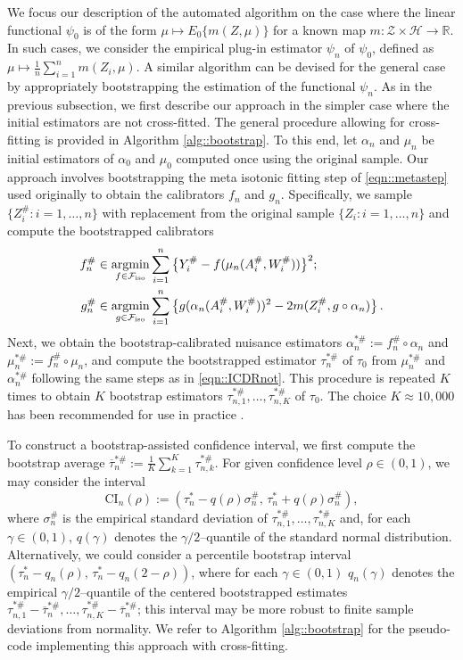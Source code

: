 \documentclass[11pt]{article}
\theoremstyle{plain}
\DeclareMathOperator*{\argmin}{argmin}
\begin{document}
 
We focus our description of the automated algorithm on the case where the linear functional \( \psi_0 \) is of the form \( \mu \mapsto E_0\{m(Z, \mu)\} \) for a known map \( m: \mathcal{Z} \times \mathcal{H} \rightarrow \mathbb{R} \). In such cases, we consider the empirical plug-in estimator \( \psi_n \) of \( \psi_0 \), defined as \( \mu \mapsto \frac{1}{n} \sum_{i=1}^n m(Z_i, \mu) \). A similar algorithm can be devised for the general case by appropriately bootstrapping the estimation of the functional \( \psi_n \). As in the previous subsection, we first describe our approach in the simpler case where the initial estimators are not cross-fitted. The general procedure allowing for cross-fitting is provided in Algorithm \ref{alg::bootstrap}. To this end, let $\alpha_n$ and $\mu_n$ be initial estimators of $\alpha_0$ and $\mu_0$ computed once using the original sample. Our approach involves bootstrapping the meta isotonic fitting step of \eqref{eqn::metastep} used originally to obtain the calibrators $f_n$ and $g_n$. Specifically, we sample $\{Z_i^{\#}: i=1,\ldots,n\}$ with replacement from the original sample $\{Z_i: i=1,\ldots,n\}$ and compute the bootstrapped calibrators
\begin{align*}
     f_n^{\#} &\in \argmin_{f \in \mathcal{F}_{\text{iso}}} \sum_{i=1}^n  \big{\{} Y_{i}^{\#} - f(\mu_{n}(A_i^{\#}, W_i^{\#}))\big{\}}^2;\\
    g_n^{\#} &\in \argmin_{g \in \mathcal{F}_{\text{iso}}}  \sum_{i=1}^n \big{\{}g(\alpha_{n}(A_i^{\#}, W_i^{\#}))^2 - 2m(Z_i^{\#},  g \circ \alpha_{n}) \big{\}}\,.
\end{align*}  
Next, we obtain the bootstrap-calibrated nuisance estimators $\alpha_{n}^{*\#} := f_n^{\#} \circ \alpha_{n}$ and $\mu_{n}^{*\#} := f_n^{\#} \circ \mu_{n}$, and compute the bootstrapped estimator $\tau_n^{*\#}$ of $\tau_0$ from $\mu_{n}^{*\#}$ and $\alpha_{n}^{*\#}$ following the same steps as in \eqref{eqn::ICDRnot}. This procedure is repeated $K$ times to obtain $K$ bootstrap estimators $\tau_{n,1}^{*\#},\ldots,\tau_{n,K}^{*\#}$ of $\tau_0$. The choice $K \approx 10,000$ has been recommended for use in practice \citep{efron1994introduction}.

To construct a bootstrap-assisted confidence interval, we first compute the bootstrap average $\overline{\tau}_n^{*\#} := \frac{1}{K}\sum_{k=1}^K \tau_{n,k}^{*\#}$. For given confidence level $\rho \in (0,1)$, we may consider the interval \[\text{CI}_n(\rho) := \left(\tau_n^*-q(\rho) \sigma_n^{\#},\,\tau_n^*+q(\rho) \sigma_n^{\#}\right),\] where $\sigma_n^{\#}$ is the empirical standard deviation of $\tau_{n,1}^{*\#},\ldots,\tau_{n,K}^{*\#}$ and, for each $\gamma\in(0,1)$, $q(\gamma)$ denotes the $\gamma/2$--quantile of the standard normal distribution. 
Alternatively, we could consider a percentile bootstrap interval $\left(\tau_n^*-q_{n}(\rho),\,\tau_n^*-q_n(2-\rho)\right)$, where for each $\gamma\in(0,1)$ $q_{n}(\gamma)$ denotes the empirical $\gamma/2$--quantile of the centered bootstrapped estimates $\tau_{n,1}^{*\#} - \overline{\tau}_n^{*\#},\ldots,\tau_{n,K}^{*\#} - \overline{\tau}_n^{*\#}$; this interval may be more robust to finite sample deviations from normality. We refer to Algorithm \ref{alg::bootstrap} for the pseudo-code implementing this approach with cross-fitting.
\end{document}
